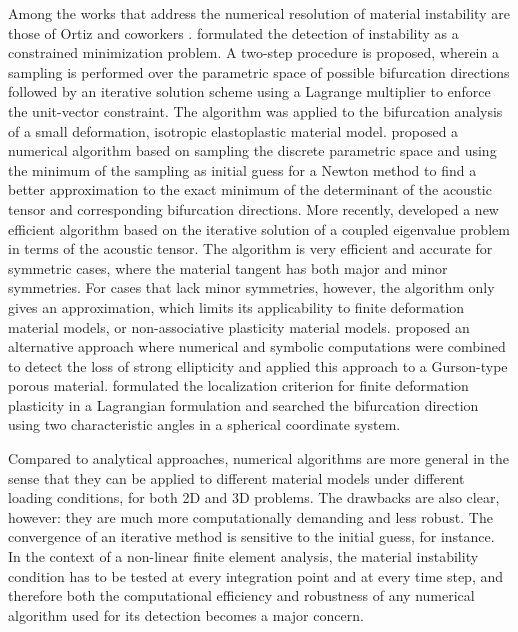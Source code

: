 \documentclass[12pt]{article}
\numberwithin{equation}{section}
\begin{document}
Among the works that address the numerical resolution of material
instability are those of Ortiz and coworkers \cite{Ortiz:1987,
  Ortiz.etal:1987}. \citet{Ortiz.etal:1987} formulated the detection
of instability as a constrained minimization problem. A two-step
procedure is proposed, wherein a sampling is performed over the
parametric space of possible bifurcation directions followed by an
iterative solution scheme using a Lagrange multiplier to enforce the
unit-vector constraint. The algorithm was applied to the bifurcation
analysis of a small deformation, isotropic elastoplastic material
model. \citet{Mosler:2005} proposed a numerical algorithm based on
sampling the discrete parametric space and using the minimum of the
sampling as initial guess for a Newton method to find a better
approximation to the exact minimum of the determinant of the acoustic
tensor and corresponding bifurcation directions. More recently,
\citet{Oliver.etal:2010} developed a new efficient algorithm based on
the iterative solution of a coupled eigenvalue problem in terms of the
acoustic tensor. The algorithm is very efficient and accurate for
symmetric cases, where the material tangent has both major and minor
symmetries. For cases that lack minor symmetries, however, the
algorithm only gives an approximation, which limits its applicability
to finite deformation material models, or non-associative plasticity
material models. \citet{Boussaa-Aravas:2001} proposed an alternative
approach where numerical and symbolic computations were combined to
detect the loss of strong ellipticity and applied this approach to a
Gurson-type porous material. \citet{Khen.etal:1998} formulated the
localization criterion for finite deformation plasticity in a
Lagrangian formulation and searched the bifurcation direction using
two characteristic angles in a spherical coordinate system.

Compared to analytical approaches, numerical algorithms are more
general in the sense that they can be applied to different material
models under different loading conditions, for both 2D and 3D
problems. The drawbacks are also clear, however: they are much more
computationally demanding and less robust. The convergence of an
iterative method is sensitive to the initial guess, for instance. In
the context of a non-linear finite element analysis, the material
instability condition has to be tested at every integration point and
at every time step, and therefore both the computational efficiency
and robustness of any numerical algorithm used for its detection
becomes a major concern.
\end{document}
